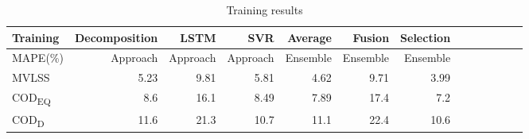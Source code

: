 \begin{longtable}[h]{@{}l *{6}{rr}}
\caption[Training results]{Training results}
\label{t:ResultsTrain}
\\
%   
\toprule%


 {\bfseries Training} & {\bfseries Decomposition} & {\bfseries LSTM} & {\bfseries SVR} & {\bfseries Average} & {\bfseries Fusion} & {\bfseries Selection}
\\

\cmidrule[0.4pt](r{0.125em}){1-1}%
\cmidrule[0.4pt](lr{0.125em}){2-7}%


  \endfirsthead

\endhead


        MAPE(\%) & Approach & Approach  & Approach  & Ensemble  & Ensemble  & Ensemble   \\ 
        \hline
        MVLSS & 5.23  & 9.81  & 5.81  & 4.62  & 9.71  & 3.99 \\ 
        COD\textsubscript{EQ} & 8.6  & 16.1 & 8.49  & 7.89  & 17.4  & 7.2   \\ 
        COD\textsubscript{D} & 11.6  & 21.3  & 10.7  & 11.1  & 22.4  & 10.6  \\ 


\bottomrule

\end{longtable}